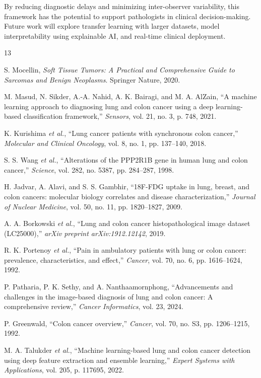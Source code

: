 \documentclass{ieeeaccess}
\begin{document}
By reducing diagnostic delays and minimizing inter-observer variability, this framework has the potential to support pathologists in clinical decision-making. Future work will explore transfer learning with larger datasets, model interpretability using explainable AI, and real-time clinical deployment.
\begin{thebibliography}{13}

S. Mocellin, \emph{Soft Tissue Tumors: A Practical and Comprehensive Guide to Sarcomas and Benign Neoplasms}. Springer Nature, 2020.

M. Masud, N. Sikder, A.-A. Nahid, A. K. Bairagi, and M. A. AlZain,
``A machine learning approach to diagnosing lung and colon cancer using a deep learning-based classification framework,''
\emph{Sensors}, vol. 21, no. 3, p. 748, 2021.

K. Kurishima \emph{et al.},
``Lung cancer patients with synchronous colon cancer,''
\emph{Molecular and Clinical Oncology}, vol. 8, no. 1, pp. 137--140, 2018.

S. S. Wang \emph{et al.},
``Alterations of the PPP2R1B gene in human lung and colon cancer,''
\emph{Science}, vol. 282, no. 5387, pp. 284--287, 1998.

H. Jadvar, A. Alavi, and S. S. Gambhir,
``18F-FDG uptake in lung, breast, and colon cancers: molecular biology correlates and disease characterization,''
\emph{Journal of Nuclear Medicine}, vol. 50, no. 11, pp. 1820--1827, 2009.

A. A. Borkowski \emph{et al.},
``Lung and colon cancer histopathological image dataset (LC25000),''
\emph{arXiv preprint arXiv:1912.12142}, 2019.

R. K. Portenoy \emph{et al.},
``Pain in ambulatory patients with lung or colon cancer: prevalence, characteristics, and effect,''
\emph{Cancer}, vol. 70, no. 6, pp. 1616--1624, 1992.

P. Patharia, P. K. Sethy, and A. Nanthaamornphong,
``Advancements and challenges in the image-based diagnosis of lung and colon cancer: A comprehensive review,''
\emph{Cancer Informatics}, vol. 23, 2024.

P. Greenwald,
``Colon cancer overview,''
\emph{Cancer}, vol. 70, no. S3, pp. 1206--1215, 1992.

M. A. Talukder \emph{et al.},
``Machine learning-based lung and colon cancer detection using deep feature extraction and ensemble learning,''
\emph{Expert Systems with Applications}, vol. 205, p. 117695, 2022.


\end{thebibliography}
\end{document}
